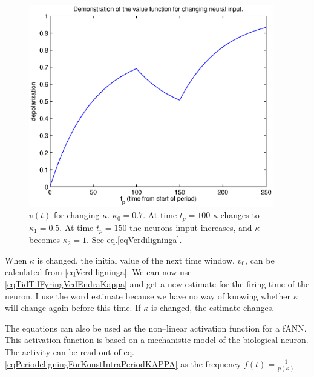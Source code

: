 \begin{figure}[hbt!p]
	\label{figVerdifunksjonen}
	\begin{center}
		\includegraphics[width=0.95\textwidth]{demonstrasjonAvUlikeKappaforVerdifunksjonen.eps}
	\end{center}
	\caption{$v(t)$ for changing $\kappa$. $\kappa_0=0.7$. At time $t_p=100$ $\kappa$ changes to $\kappa_1=0.5$. At time $t_p=150$ the neurons imput increases, and $\kappa$ becomes $\kappa_2=1$. See eq.\eqref{eqVerdiligninga}.}
\end{figure}

When $\kappa$ is changed, the initial value of the next time window, $v_0$, can be calculated from \eqref{eqVerdiligninga}. 
We can now use \eqref{eqTidTilFyringVedEndraKappa} and get a new estimate for the firing time of the neuron.
I use the word estimate because we have no way of knowing whether $\kappa$ will change again before this time. If $\kappa$ is changed, the estimate changes.






The equations can also be used as the non--linear activation function for a fANN. This activation function is based on a mechanistic model of the biological neuron.
The activity can be read out of eq. \eqref{eqPeriodeligningForKonstIntraPeriodKAPPA} as the frequency $f(t) = \frac{1}{p(\kappa)}$


